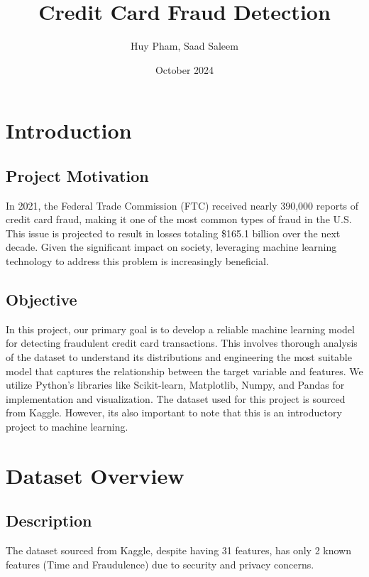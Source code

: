 \documentclass[12pt, letterpaper]{article}
\title{Credit Card Fraud Detection}
\author{Huy Pham, Saad Saleem}
\date{October 2024}
\begin{document}
\maketitle

\section{Introduction}
    \subsection{Project Motivation}
        In 2021, the Federal Trade Commission (FTC) received nearly 390,000 reports of credit card fraud, making it one of the most common types of fraud in the U.S. This issue is projected to result in losses totaling \$165.1 billion over the next decade. Given the significant impact on society, leveraging machine learning technology to address this problem is increasingly beneficial.

    \subsection{Objective}
        In this project, our primary goal is to develop a reliable machine learning model for detecting fraudulent credit card transactions. This involves thorough analysis of the dataset to understand its distributions and engineering the most suitable model that captures the relationship between the target variable and features. We utilize Python's libraries like Scikit-learn, Matplotlib, Numpy, and Pandas for implementation and visualization. The dataset used for this project is sourced from Kaggle. However, its also important to note that this is an introductory project to machine learning.
    
 
\section{Dataset Overview}
    \subsection{Description}
        The dataset sourced from Kaggle, despite having 31 features, has only 2 known features (Time and Fraudulence) due to security and privacy concerns.  
\end{document}
